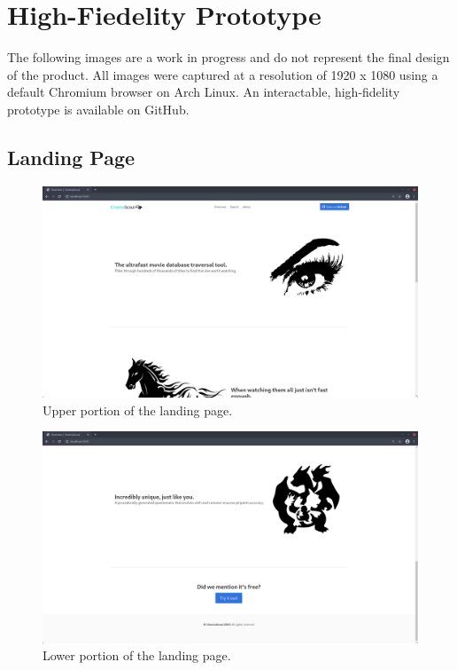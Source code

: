 \documentclass{article}
\begin{document}
\section{High-Fiedelity Prototype}
The following images are a work in progress and do not represent the final
design of the product. All images were captured at a resolution of 1920 x
1080 using a default Chromium browser on Arch Linux. An interactable, 
high-fidelity prototype is available on GitHub.
\subsection{Landing Page}
\begin{figure}[H]
\includegraphics[width=\columnwidth]{res/landing_1.png}
\caption{Upper portion of the landing page.}
\end{figure}
\begin{figure}[H]
\includegraphics[width=\columnwidth]{res/landing_2.png}
\caption{Lower portion of the landing page.}
\end{figure}
\end{document}
